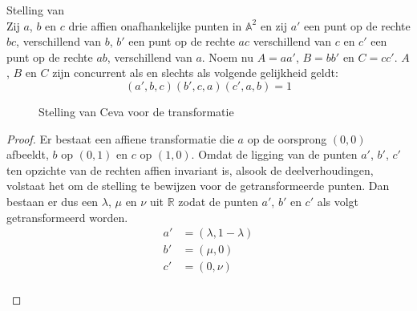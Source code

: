 \documentclass[main.tex]{subfiles}
\begin{document}
\begin{st}
  Stelling van \\
  Zij $a$, $b$ en $c$ drie affien onafhankelijke punten in $\mathbb{A}^{2}$ en zij $a'$ een punt op de rechte $bc$, verschillend van $b$, $b'$ een punt op de rechte $ac$ verschillend van $c$ en $c'$ een punt op de rechte $ab$, verschillend van $a$.
  Noem nu $A = aa'$, $B = bb'$ en $C=cc'$.
  $A$, $B$ en $C$ zijn concurrent als en slechts als volgende gelijkheid geldt:
  \[ (a',b,c)(b',c,a)(c',a,b) = 1\]
  \begin{figure}[H]
    \centering
    \caption{Stelling van Ceva voor de transformatie}
    \label{fig:stelling-van-ceva-voor}
  \end{figure}

  \begin{proof}
    Er bestaat een affiene transformatie die $a$ op de oorsprong $(0,0)$ afbeeldt, $b$ op $(0,1)$ en $c$ op $(1,0)$.
    Omdat de ligging van de punten $a'$, $b'$, $c'$ ten opzichte van de rechten affien invariant is, alsook de deelverhoudingen, volstaat het om de stelling te bewijzen voor de getransformeerde punten.
    Dan bestaan er dus een $\lambda$, $\mu$ en $\nu$ uit $\mathbb{R}$ zodat de punten $a'$, $b'$ en $c'$ als volgt getransformeerd worden.
    \[
    \begin{array}{cl}
      a' &= (\lambda,1-\lambda)\\
      b' &= (\mu, 0)\\
      c' &= (0,\nu)\\
    \end{array}
    \]
    \begin{figure}[H]
      \centering
\end{figure}
\end{proof}
\end{st}
\end{document}
